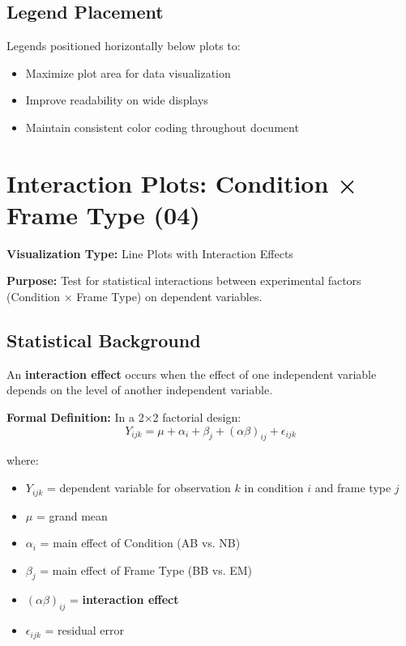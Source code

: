 \documentclass[12pt,a4paper]{article}
\begin{document}
\subsection{Legend Placement}

Legends positioned horizontally below plots to:
\begin{itemize}
    \item Maximize plot area for data visualization
    \item Improve readability on wide displays
    \item Maintain consistent color coding throughout document
\end{itemize}

\newpage
\section{Interaction Plots: Condition × Frame Type (04)}

\textbf{Visualization Type:} Line Plots with Interaction Effects

\textbf{Purpose:} Test for statistical interactions between experimental factors (Condition × Frame Type) on dependent variables.

\subsection{Statistical Background}

An \textbf{interaction effect} occurs when the effect of one independent variable depends on the level of another independent variable.

\textbf{Formal Definition:} In a 2×2 factorial design:
\begin{equation}
Y_{ijk} = \mu + \alpha_i + \beta_j + (\alpha\beta)_{ij} + \epsilon_{ijk}
\end{equation}

where:
\begin{itemize}
    \item $Y_{ijk}$ = dependent variable for observation $k$ in condition $i$ and frame type $j$
    \item $\mu$ = grand mean
    \item $\alpha_i$ = main effect of Condition (AB vs. NB)
    \item $\beta_j$ = main effect of Frame Type (BB vs. EM)
    \item $(\alpha\beta)_{ij}$ = \textbf{interaction effect}
    \item $\epsilon_{ijk}$ = residual error
\end{itemize}
\end{document}
